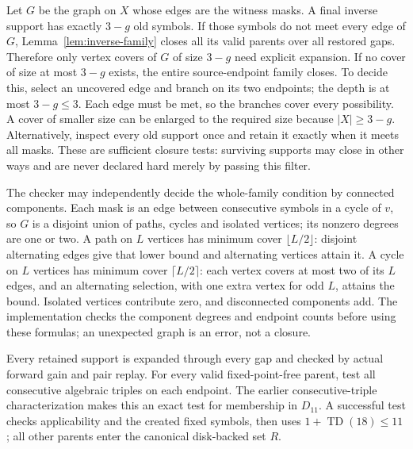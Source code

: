 \documentclass[11pt,a4paper]{article}
\newcommand{\TD}{\operatorname{TD}}
\begin{document}
Let $G$ be the graph on $X$ whose edges are the witness masks. A final inverse
support has exactly $3-g$ old symbols. If those symbols do not meet every
edge of $G$, Lemma~\ref{lem:inverse-family} closes all its valid parents over
all restored gaps. Therefore only vertex covers of $G$ of size $3-g$ need
explicit expansion. If no cover of size at most $3-g$ exists, the entire
source-endpoint family closes. To decide this, select an uncovered edge and
branch on its two endpoints; the depth is at most $3-g\leq3$. Each edge must
be met, so the branches cover every possibility. A cover of smaller size can
be enlarged to the required size because $|X|\geq3-g$. Alternatively, inspect
every old support once and retain it exactly when it meets all masks.
These are sufficient closure tests: surviving supports may close in other
ways and are never declared hard merely by passing this filter.

The checker may independently decide the whole-family condition by connected
components. Each mask is an edge between consecutive symbols in a cycle of
$v$, so $G$ is a disjoint union of paths, cycles and isolated vertices; its
nonzero degrees are one or two. A path on $L$ vertices has minimum cover
$\lfloor L/2\rfloor$: disjoint alternating edges give that lower bound and
alternating vertices attain it. A cycle on $L$ vertices has minimum
cover $\lceil L/2\rceil$: each vertex covers at most two of its $L$ edges,
and an alternating selection, with one extra vertex for odd $L$, attains the
bound. Isolated vertices contribute zero, and disconnected components add.
The implementation checks the component degrees and endpoint counts before
using these formulas; an unexpected graph is an error, not a closure.

Every retained support is expanded through every gap and checked by actual
forward gain and pair replay. For every valid fixed-point-free parent, test
all consecutive algebraic triples on each endpoint. The earlier
consecutive-triple characterization makes this an exact test for membership
in $D_{11}$. A successful test checks applicability and the created fixed
symbols, then uses $1+\TD(18)\leq11$; all other parents enter the canonical
disk-backed set $R$.
\end{document}

